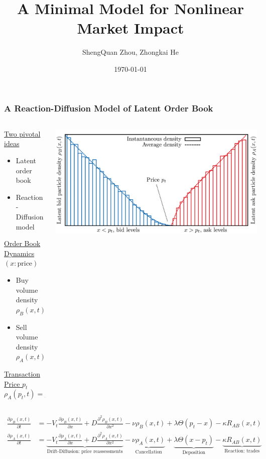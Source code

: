 \documentclass{beamer}
\title[Nonlinear Market Impact]{A Minimal Model for Nonlinear Market Impact}
\author{ShengQuan Zhou, Zhongkai He} %
\institute[Baruch] 
{
Baruch MFE \\ %
}
\date{\today} %
\begin{document}
\begin{frame}
\titlepage %
\end{frame}



\begin{frame}
\frametitle{A Reaction-Diffusion Model of Latent Order Book}
{
\footnotesize{
\begin{columns}
\begin{column}{0.4\textwidth}
   \underline{Two pivotal ideas}
   \begin{itemize}
       \item Latent order book
       \item Reaction-Diffusion model
   \end{itemize}
   \underline{Order Book Dynamics $(x:\text{price})$}
   \begin{itemize}
       \item Buy volume density $\rho_B(x,t)$
       \item Sell volume density $\rho_A(x,t)$
   \end{itemize}
   \underline{Transaction Price $p_t$}
   $$
   \boxed{
       \rho_A(p_t, t) = \rho_B(p_t, t) 
       }  
   $$
\end{column}
\begin{column}{0.6\textwidth}  %
    \begin{center}
     \includegraphics[width=\textwidth,height=.5\textheight]{llob}
     \end{center}
\end{column}
\end{columns}

\begin{align*}
\frac{\partial \rho_B(x,t)}{\partial t} &= -V_t \frac{\partial \rho_B(x,t)}{\partial x}
+ D  \frac{\partial^2 \rho_B(x,t)}{\partial x^2} -\nu \rho_B(x,t) +\lambda \Theta(p_t -x) - \kappa R_{AB}(x,t)\\
\frac{\partial \rho_A(x,t)}{\partial t} &= \underbrace{-V_t \frac{\partial \rho_A(x,t)}{\partial x}
+ D  \frac{\partial^2 \rho_A(x,t)}{\partial x^2}}_{\text{Drift-Diffusion: price reassessments}} -\underbrace{\nu \rho_A(x,t)}_{\text{Cancellation}} +\underbrace{\lambda \Theta(x-p_t)}_{\text{Deposition}} - \underbrace{\kappa R_{AB}(x,t)}_{\text{Reaction: trades}}
\end{align*}

}
}
\end{frame}
\end{document}
